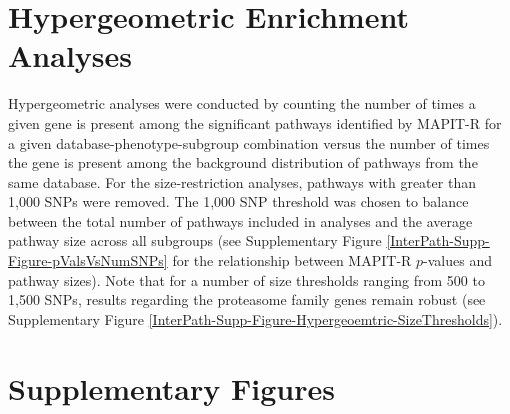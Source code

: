 \documentclass[10pt]{article}
\begin{document}
\section{Hypergeometric Enrichment Analyses}

Hypergeometric analyses were conducted by counting the number of times a given gene is present among the significant pathways identified by MAPIT-R for a given database-phenotype-subgroup combination versus the number of times the gene is present among the background distribution of pathways from the same database. For the size-restriction analyses, pathways with greater than 1,000 SNPs were removed. The 1,000 SNP threshold was chosen to balance between the total number of pathways included in analyses and the average pathway size across all subgroups (see Supplementary Figure \ref{InterPath-Supp-Figure-pValsVsNumSNPs} for the relationship between MAPIT-R $p$-values and pathway sizes). Note that for a number of size thresholds ranging from 500 to 1,500 SNPs, results regarding the proteasome family genes remain robust (see Supplementary Figure \ref{InterPath-Supp-Figure-Hypergeoemtric-SizeThresholds}).


\clearpage
\newpage

\section{Supplementary Figures}\label{Supplementary-Figures}

\renewcommand{\figurename}{Supplementary Figure}
\renewcommand{\tablename}{Supplementary Table}
\setcounter{figure}{0}
\setcounter{table}{0}
\end{document}
